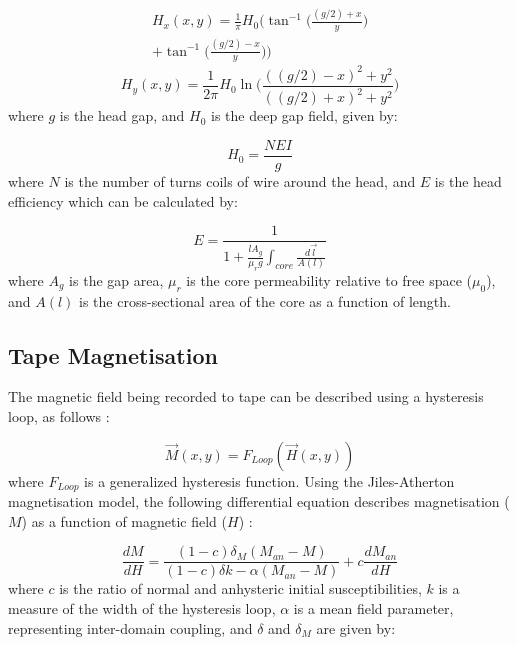 \documentclass[twoside,a4paper]{article}
\begin{document}
\begin{multline}
    H_x(x,y) = \frac{1}{\pi} H_0 \Big(\tan^{-1} \Big(\frac{(g/2) + x}{y} \Big) \\
    + \tan^{-1} \Big(\frac{(g/2) - x}{y} \Big) \Big)
    \label{eq:H_x}
\end{multline}
\begin{equation}
    H_y(x,y) = \frac{1}{2 \pi} H_0 \ln \Big(\frac{((g/2) - x)^2 + y^2}{((g/2) + x)^2 + y^2} \Big)
    \label{eq:H_y}
\end{equation}
%
where $g$ is the head gap, and $H_0$ is the deep gap field, given by:

\begin{equation}
    H_0 = \frac{NEI}{g}
\end{equation}
%
where $N$ is the number of turns coils of wire around the head, and $E$ is the head 
efficiency which can be calculated by:

\begin{equation}
    E = \frac{1}{1 + \frac{l  A_g}{\mu_r g} \int_{core} \frac {d \vec{l}}{A(l)}}
\end{equation}
%
where $A_g$ is the gap area, $\mu_r$ is the core permeability relative to 
free space ($\mu_0$), and $A(l)$ is the cross-sectional 
area of the core as a function of length.

\subsection{Tape Magnetisation}
The magnetic field being recorded to tape can be described using 
a hysteresis loop, as follows \cite{1994tmr..book.....B}:

\begin{equation}
    \vec{M}(x,y) = F_{Loop}(\vec{H}(x,y))
\end{equation}
%
where $F_{Loop}$ is a generalized hysteresis function.
\newline\newline
Using the Jiles-Atherton magnetisation model, the following
differential equation describes magnetisation ($M$) as a function 
of magnetic field ($H$) \cite{Hysteresis}:

\begin{equation}
    \frac{dM}{dH} = \frac{(1-c) \delta_M (M_{an} - M)}{(1-c) \delta k - \alpha (M_{an} - M)} + c \frac{dM_{an}}{dH}
    \label{eq5}
\end{equation}
%
where $c$ is the ratio of normal and anhysteric initial susceptibilities,
$k$ is a measure of the width of the hysteresis
loop, $\alpha$ is a mean field parameter, representing inter-domain
coupling, and $\delta$ and $\delta_M$ are given by:
\end{document}
